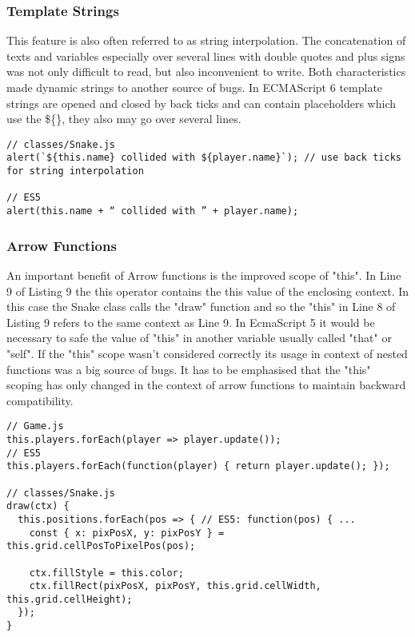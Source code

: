 \documentclass{bioinfo}
\begin{document}
\subsubsection{Template Strings}
This feature is also often referred to as string interpolation.
The concatenation of texts and variables especially over several lines with double quotes and plus signs was not only difficult to read, but also inconvenient to write.  
Both characteristics made dynamic strings to another source of bugs. In ECMAScript 6 template strings are opened and closed by back ticks and can contain placeholders which use the
\$\{\}, they also may go over several lines.

\begin{lstlisting}[caption= My Javascript Example]
// classes/Snake.js
alert(`${this.name} collided with ${player.name}`); // use back ticks for string interpolation

// ES5
alert(this.name + “ collided with ” + player.name);
\end{lstlisting}

\subsubsection{Arrow Functions}

An important benefit of Arrow functions is the improved scope of "this". In Line 9 of Listing 9 the this operator 
contains the this value of the enclosing context. In this case the Snake class calls the "draw" function and so 
the "this" in Line 8 of Listing 9 refers to the same context as Line 9. In EcmaScript 5 it would be necessary to safe the
value of "this" in another variable usually called "that" or "self". If the "this" scope wasn't considered correctly its usage
in context of nested functions was a big source of bugs. It has to be emphasised that the "this" scoping has only changed in the
context of arrow functions to maintain backward compatibility.

\begin{lstlisting}[caption= My Javascript Example]
// Game.js
this.players.forEach(player => player.update());
// ES5
this.players.forEach(function(player) { return player.update(); });

// classes/Snake.js
draw(ctx) {
  this.positions.forEach(pos => { // ES5: function(pos) { ...
    const { x: pixPosX, y: pixPosY } = this.grid.cellPosToPixelPos(pos);

    ctx.fillStyle = this.color;
    ctx.fillRect(pixPosX, pixPosY, this.grid.cellWidth, this.grid.cellHeight);
  });
}
\end{lstlisting}
\end{document}

